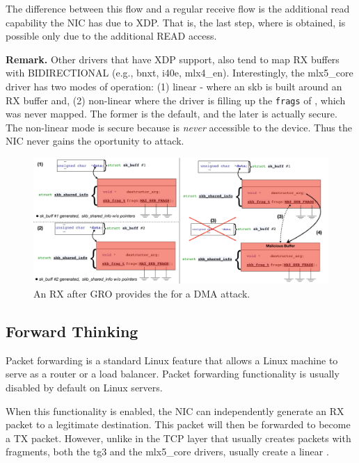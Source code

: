 The difference between this flow and a regular receive flow is the additional read capability the NIC has due to XDP. That is, the last step, where \kva is obtained, is possible only due to the additional READ access.

\smallskip
\noindent\textbf{Remark.} Other drivers that have XDP support, also tend to map RX buffers with BIDIRECTIONAL (e.g., bnxt, i40e, mlx4\_en). Interestingly, the mlx5\_core driver has two modes of operation: (1) linear - where an skb is built around an RX buffer and, (2) non-linear where the driver is filling up the \texttt{frags} of \shinfo, which was never mapped. The former is the default, and the later is actually secure. The non-linear mode is secure because \shinfo{} is \emph{never} accessible to the device. Thus the NIC never gains the oportunity to attack.

\begin{figure}[t]
    \centering
    \includegraphics[width=\linewidth]{figs/gro.pdf}
    \caption{An RX \skb{} after GRO provides the \kva{} for a DMA attack.}
    \label{fig:gro_xdp}
\end{figure}

\subsection{Forward Thinking}\label{sec:forward}

Packet forwarding is a standard Linux feature that allows a Linux machine to serve as a router or a load balancer. Packet forwarding functionality is usually disabled by default on Linux servers.

When this functionality is enabled, the NIC can independently generate an RX packet to a legitimate destination. This packet will then be forwarded to become a TX packet. However, unlike in the TCP layer that usually creates \skb{} packets with fragments, both the tg3 and the mlx5\_core drivers, usually create a linear \skb{}.


